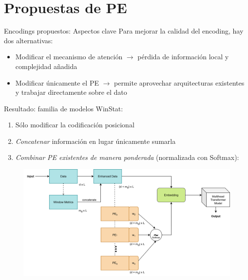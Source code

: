 \documentclass[compress]{beamer}
\begin{document}
	\section{Propuestas de PE}
	\begin{frame}{Encodings propuestos: Aspectos clave}
		Para mejorar la calidad del encoding, hay dos alternativas:
		\begin{itemize}
			\item Modificar el mecanismo de atención $\rightarrow$ pérdida de información local y complejidad añadida
			\item Modificar únicamente el PE $\rightarrow$ permite aprovechar arquitecturas existentes y trabajar directamente sobre el dato
		\end{itemize}
		
		Resultado: familia de modelos WinStat:
		\begin{enumerate}
			\item Sólo modificar la codificación posicional
			\item \emph{Concatenar} información en lugar únicamente sumarla
			\item \emph{Combinar PE existentes de manera ponderada} (normalizada con Softmax):
			
			 \end{enumerate}
	\end{frame}
	
	
	\begin{frame}
		\begin{figure}
			\includegraphics[width=\linewidth]{pic/enhancedhybrid.png}
		\end{figure}
		
	\end{frame}
	
\end{document}
